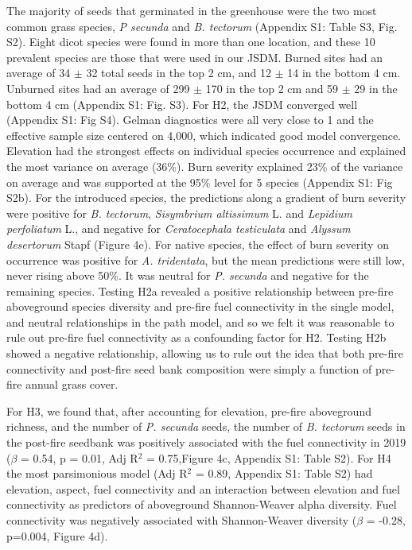 \documentclass[
  12pt,
]{article}
\begin{document}
The majority of seeds that germinated in the greenhouse were the two
most common grass species, \emph{P secunda} and \emph{B. tectorum}
(Appendix S1: Table S3, Fig. S2). Eight dicot species were found in more
than one location, and these 10 prevalent species are those that were
used in our JSDM. Burned sites had an average of 34 \(\pm\) 32 total
seeds in the top 2 cm, and 12 \(\pm\) 14 in the bottom 4 cm. Unburned
sites had an average of 299 \(\pm\) 170 in the top 2 cm and 59 \(\pm\)
29 in the bottom 4 cm (Appendix S1: Fig. S3). For H2, the JSDM converged
well (Appendix S1: Fig S4). Gelman diagnostics were all very close to 1
and the effective sample size centered on 4,000, which indicated good
model convergence. Elevation had the strongest effects on individual
species occurrence and explained the most variance on average (36\%).
Burn severity explained 23\% of the variance on average and was
supported at the 95\% level for 5 species (Appendix S1: Fig S2b). For
the introduced species, the predictions along a gradient of burn
severity were positive for \emph{B. tectorum}, \emph{Sisymbrium
altissimum} L. and \emph{Lepidium perfoliatum} L., and negative for
\emph{Ceratocephala testiculata} and \emph{Alyssum desertorum} Stapf
(Figure 4e). For native species, the effect of burn severity on
occurrence was positive for \emph{A. tridentata}, but the mean
predictions were still low, never rising above 50\%. It was neutral for
\emph{P. secunda} and negative for the remaining species. Testing H2a
revealed a positive relationship between pre-fire aboveground species
diversity and pre-fire fuel connectivity in the single model, and
neutral relationships in the path model, and so we felt it was
reasonable to rule out pre-fire fuel connectivity as a confounding
factor for H2. Testing H2b showed a negative relationship, allowing us
to rule out the idea that both pre-fire connectivity and post-fire seed
bank composition were simply a function of pre-fire annual grass cover.

For H3, we found that, after accounting for elevation, pre-fire
aboveground richness, and the number of \emph{P. secunda} seeds, the
number of \emph{B. tectorum} seeds in the post-fire seedbank was
positively associated with the fuel connectivity in 2019 (\(\beta\) =
0.54, p = 0.01, Adj R\(^2\) = 0.75,Figure 4c, Appendix S1: Table S2).
For H4 the most parsimonious model (Adj R\(^2\) = 0.89, Appendix S1:
Table S2) had elevation, aspect, fuel connectivity and an interaction
between elevation and fuel connectivity as predictors of aboveground
Shannon-Weaver alpha diversity. Fuel connectivity was negatively
associated with Shannon-Weaver diversity (\(\beta\) = -0.28, p=0.004,
Figure 4d).
\end{document}
